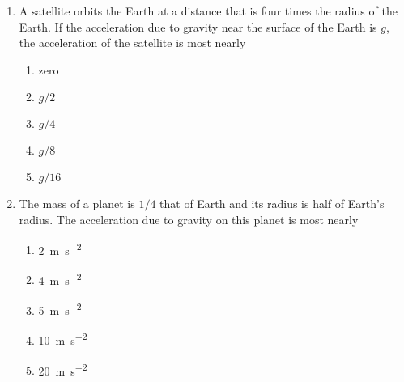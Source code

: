 \documentclass{../../../oss-apphys}
\begin{document}
\begin{multicols}{2}
\begin{enumerate}[leftmargin=18pt]
  \item A satellite orbits the Earth at a distance that is four times the radius
    of the Earth. If the acceleration due to gravity near the surface of the
    Earth is $g$, the acceleration of the satellite is most nearly
    \begin{enumerate}[nosep,leftmargin=18pt,label=(\Alph*)]
    \item zero
    \item $g/2$
    \item $g/4$
    \item $g/8$
    \item $g/16$
    \end{enumerate}

  \item The mass of a planet is $1/4$ that of Earth and its radius is half of
    Earth's radius. The acceleration due to gravity on this planet is most
    nearly
    \begin{enumerate}[nosep,leftmargin=18pt,label=(\Alph*)]
    \item\SI{2}{\metre\per\second\squared}
    \item\SI{4}{\metre\per\second\squared}
    \item\SI{5}{\metre\per\second\squared}
    \item\SI{10}{\metre\per\second\squared}
    \item\SI{20}{\metre\per\second\squared}
    \end{enumerate}
  
%  
    

\end{enumerate}
\end{multicols}
\end{document}
